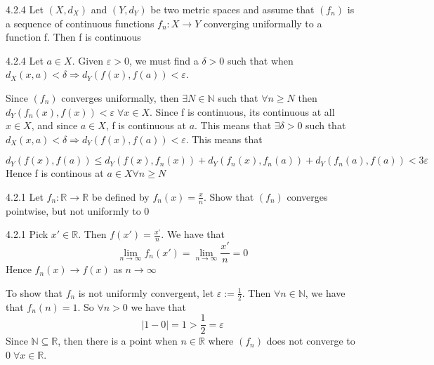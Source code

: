 \documentclass[a4paper,norsk]{article}
\renewcommand{\geq}{\geqslant}
\renewcommand{\leq}{\leqslant}
\renewcommand{\epsilon}{\varepsilon}
\begin{document}
\begin{propositionbox}{4.2.4}{}
Let $ \left( X, d_X \right)  $ and $ \left( Y, d_Y \right)  $ be two metric spaces and assume that $ \left( f_n \right)  $ is a sequence of continuous functions $ f_n : X \to Y $ converging uniformally to a function f. Then f is continuous

\begin{proofbox}{4.2.4}{}
  Let $ a \in X $. Given $ \epsilon > 0 $, we must find a $ \delta > 0 $ such that when $ d_X \left( x, a \right) < \delta  \Rightarrow d_Y \left( f(x), f(a) \right) < \epsilon  $. 

  Since $ \left( f_n \right)  $ converges uniformally, then $ \exists N \in \mathbb{N} $ such that $ \forall n \geq N $ then $ d_Y \left( f_n(x), f(x) \right) < \epsilon \; \forall  x \in X $. Since f is continuous, its continuous at all $ x \in X $, and since $ a \in X $, f is continuous at $ a $. This means that $ \exists \delta > 0 $ such that $ d_X \left( x, a \right) < \delta \Rightarrow d_Y \left( f(x), f(a) \right) < \epsilon  $. This means that

  \[
      d_Y \left( f(x), f(a) \right) \leq d_Y \left( f(x), f_n(x) \right) + d_Y \left( f_n(x), f_n(a) \right) + d_Y \left( f_n(a), f(a) \right) < 3 \epsilon
  \]
  Hence f is continous at $ a \in X \forall n \geq N $ 
\end{proofbox}
\end{propositionbox}


\begin{oppgavebox}{4.2.1}{}
Let $ f_n : \mathbb{R} \to \mathbb{R} $ be defined by $ f_n(x) = \frac{ x }{ n } $. Show that $ \left( f_n \right)  $ converges pointwise, but not uniformly to 0

\begin{proofbox}{4.2.1}{}
  Pick $ x' \in \mathbb{R} $. Then $ f \left( x' \right) = \frac{ x' }{ n } $. We have that 
  \[
      \lim_{n \to \infty} f_n(x') = \lim_{n \to \infty} \frac{ x' }{ n } = 0 
  \]
  Hence $ f_n(x) \to f(x) $ as $ n \to \infty$
  
  

  To show that $ f_n $ is not uniformly convergent, let $ \epsilon := \frac{ 1 }{ 2 } $. Then $ \forall n \in \mathbb{N} $, we have that $ f_n(n) = 1 $. So $ \forall n > 0 $  we have that 
  \[
      \left| 1 - 0 \right| = 1 > \frac{ 1 }{ 2 } = \epsilon 
  \]
  Since $ \mathbb{N} \subseteq \mathbb{R} $, then there is a point when $ n \in \mathbb{R} $  where $ \left( f_n \right)  $ does not converge to $ 0 \; \forall x \in \mathbb{R} $.
  
  
\end{proofbox}
\end{oppgavebox}
\end{document}
